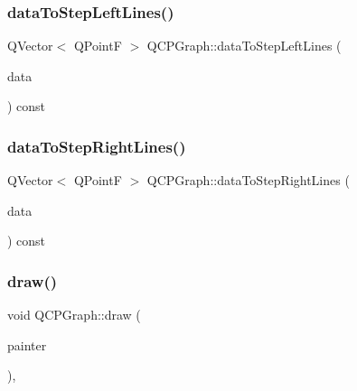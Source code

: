 \mbox{\label{class_q_c_p_graph_a1f3e9e41fc67538c4940c74665840474}} 
\subsubsection{\texorpdfstring{dataToStepLeftLines()}{dataToStepLeftLines()}}
{\footnotesize\ttfamily Q\+Vector$<$ Q\+PointF $>$ Q\+C\+P\+Graph\+::data\+To\+Step\+Left\+Lines (\begin{DoxyParamCaption}\item[{const Q\+Vector$<$ \mbox{\hyperlink{class_q_c_p_graph_data}{Q\+C\+P\+Graph\+Data}} $>$ \&}]{data }\end{DoxyParamCaption}) const\hspace{0.3cm}{\ttfamily [protected]}}

\mbox{\label{class_q_c_p_graph_ab1fb6cb91d24a854f85bf54200f6d101}} 
\subsubsection{\texorpdfstring{dataToStepRightLines()}{dataToStepRightLines()}}
{\footnotesize\ttfamily Q\+Vector$<$ Q\+PointF $>$ Q\+C\+P\+Graph\+::data\+To\+Step\+Right\+Lines (\begin{DoxyParamCaption}\item[{const Q\+Vector$<$ \mbox{\hyperlink{class_q_c_p_graph_data}{Q\+C\+P\+Graph\+Data}} $>$ \&}]{data }\end{DoxyParamCaption}) const\hspace{0.3cm}{\ttfamily [protected]}}

\mbox{\label{class_q_c_p_graph_a2b0849598f06e834b43ce18cd13bcdc3}} 
\subsubsection{\texorpdfstring{draw()}{draw()}}
{\footnotesize\ttfamily void Q\+C\+P\+Graph\+::draw (\begin{DoxyParamCaption}\item[{\mbox{\hyperlink{class_q_c_p_painter}{Q\+C\+P\+Painter}} $\ast$}]{painter }\end{DoxyParamCaption})\hspace{0.3cm}{\ttfamily [protected]}, {\ttfamily [virtual]}}




